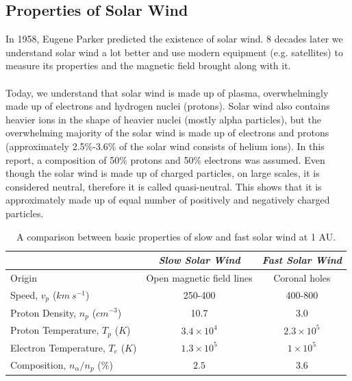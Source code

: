 \documentclass[12pt]{article}
\begin{document}
    \subsection{Properties of Solar Wind}\label{sec:solarwind}
        In 1958, Eugene Parker predicted the existence of solar wind\cite{1958parker}. 8 decades later we understand solar wind a lot better and use modern equipment (e.g. satellites) to measure its properties and the magnetic field brought along with it.\\ \\
        Today, we understand that solar wind is made up of plasma, overwhelmingly made up of electrons and hydrogen nuclei (protons). Solar wind also contains heavier ions in the shape of heavier nuclei (mostly alpha particles), but the overwhelming majority of the solar wind is made up of electrons and protons (approximately 2.5\%-3.6\% of the solar wind consists of helium ions\cite{2006schwenn}). In this report, a composition of 50\% protons and 50\% electrons was assumed. Even though the solar wind is made up of charged particles, on large scales, it is considered neutral, therefore it is called quasi-neutral\cite{2007meyer}. This shows that it is approximately made up of equal number of positively and negatively charged particles.\\
        \begin{table}[t!]
            \begin{center}
                \begin{tabular}{|l|c|c|} \hline
                    &\textit{Slow Solar Wind}&\textit{Fast Solar Wind}\\ \hline
                    Origin&Open magnetic field lines&Coronal holes\\ \hline
                    Speed, $v_p$ ($km\ s^{-1}$)&250-400&400-800\\ \hline
                    Proton Density, $n_p$ ($cm^{-3}$)&10.7&3.0\\ \hline
                    Proton Temperature, $T_p$ ($K$)&$3.4\times 10^4$&$2.3\times 10^5$\\ \hline
                    Electron Temperature, $T_e$ ($K$)&$1.3\times 10^5$&$1\times 10^5$\\ \hline
                    Composition, $n_\alpha /n_p$ ($\%$)&$2.5$&$3.6$\\ \hline
                \end{tabular}
                \caption{A comparison between basic properties of slow and fast solar wind at 1 AU.\cite{2006schwenn} \label{tab:slowfast}}
            \end{center}
        \end{table}\\
\end{document}
